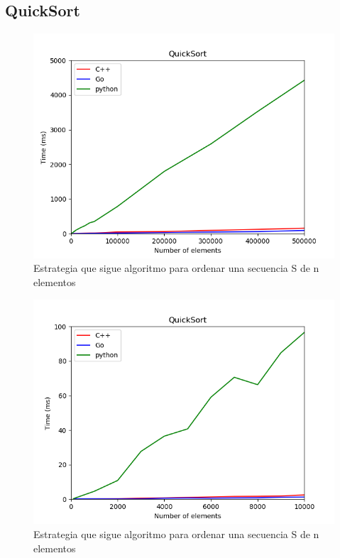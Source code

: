 \documentclass{article}
\begin{document}
    \subsection{QuickSort}
            \begin{figure}[h!]
            \centering
            \includegraphics[width=12cm]{img/QuickSort_1.png}
            \caption{Estrategia que sigue algoritmo para ordenar una secuencia S de n elementos}
            \label{fig:mergesort}
        \end {figure}
                \begin{figure}[h!]
            \centering
            \includegraphics[width=12cm]{img/QuickSort_2.png}
            \caption{Estrategia que sigue algoritmo para ordenar una secuencia S de n elementos}
            \label{fig:mergesort}
        \end {figure}
\end{document}
